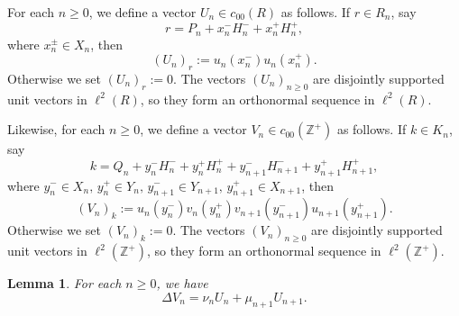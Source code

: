 \documentclass[11pt,reqno]{amsart}
\theoremstyle{plain}
\newtheorem{lemma}[theorem]{Lemma}
\theoremstyle{definition}
\theoremstyle{remark}
\newcommand{\ZZ}{\mathbb{Z}}
\begin{document}
For each $n\ge0$, we define a vector $U_n\in c_{00}(R)$ 
as follows. If $r\in R_n$, say
\[
r=P_n+x_n^-H_n^-+x_n^+H_n^+,
\]
where $x_n^{\pm}\in X_n$, then
\[
(U_n)_r:=u_n(x_n^-)u_n(x_n^+).
\]
Otherwise we set $(U_n)_r:=0$.
The vectors $(U_n)_{n\ge0}$ are disjointly supported 
unit vectors in $\ell^2(R)$, so they form an orthonormal
sequence in $\ell^2(R)$.

Likewise, for each $n\ge0$, we define a vector $V_n\in c_{00}(\ZZ^+)$ as follows.
If $k\in K_n$, say
\[
k=Q_n+y_n^-H_n^-+y_n^+H_n^++y_{n+1}^-H_{n+1}^-+y_{n+1}^+H_{n+1}^+,
\]
where  $y_n^-\in X_n,\, y_n^+\in Y_n,\, y_{n+1}^-\in Y_{n+1}, \, y_{n+1}^+\in X_{n+1}$, then
\[
(V_n)_k:=u_n(y_n^-)v_n(y_n^+)v_{n+1}(y_{n+1}^-)u_{n+1}(y_{n+1}^+).
\]
Otherwise we set $(V_n)_k:=0$.
The vectors $(V_n)_{n\ge0}$ are disjointly supported unit vectors
in $\ell^2(\ZZ^+)$, so they form an orthonormal
sequence in $\ell^2(\ZZ^+)$.

\begin{lemma}\label{L:DeltaVcalc}
For each $n\ge0$, we have
\[
\Delta V_n=\nu_n U_n+\mu_{n+1}U_{n+1}.
\]
\end{lemma}
\end{document}
